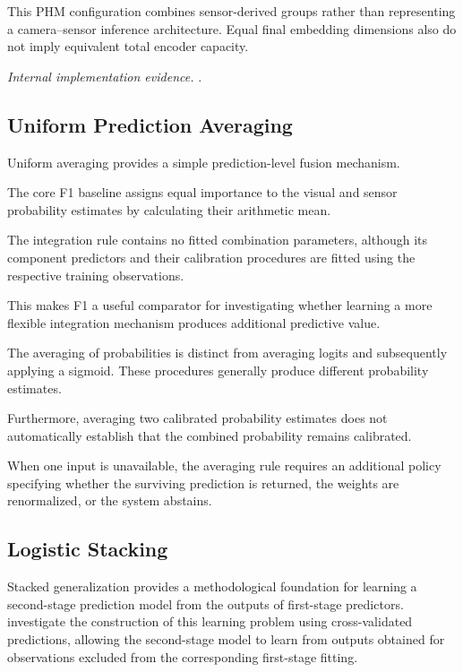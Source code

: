 This PHM configuration combines sensor-derived groups rather than representing a camera–sensor inference architecture. Equal final embedding dimensions also do not imply equivalent total encoder capacity.

\noindent\textit{Internal implementation evidence.} .

\subsection{Uniform Prediction Averaging}

Uniform averaging provides a simple prediction-level fusion mechanism.

The core F1 baseline assigns equal importance to the visual and sensor probability estimates by calculating their arithmetic mean.

The integration rule contains no fitted combination parameters, although its component predictors and their calibration procedures are fitted using the respective training observations.

This makes F1 a useful comparator for investigating whether learning a more flexible integration mechanism produces additional predictive value.

The averaging of probabilities is distinct from averaging logits and subsequently applying a sigmoid. These procedures generally produce different probability estimates.

Furthermore, averaging two calibrated probability estimates does not automatically establish that the combined probability remains calibrated.

When one input is unavailable, the averaging rule requires an additional policy specifying whether the surviving prediction is returned, the weights are renormalized, or the system abstains.

\subsection{Logistic Stacking}

Stacked generalization provides a methodological foundation for learning a second-stage prediction model from the outputs of first-stage predictors. \textcite{Ting1999Issues} investigate the construction of this learning problem using cross-validated predictions, allowing the second-stage model to learn from outputs obtained for observations excluded from the corresponding first-stage fitting.

